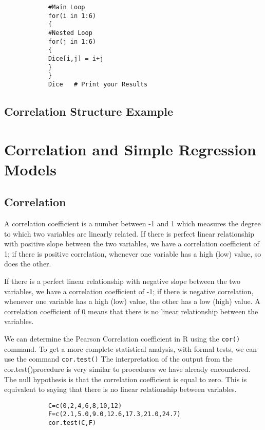 \documentclass[a4paper,12pt]{article}
\begin{document}
\begin{itemize}
\begin{itemize}
\begin{framed}
\begin{verbatim}
			#Main Loop
			for(i in 1:6)
			{
			#Nested Loop
			for(j in 1:6)
			{
			Dice[i,j] = i+j
			}
			}		
			Dice   # Print your Results
			\end{verbatim}
		\end{framed}
		\subsection{Correlation Structure Example}
		
		
		\newpage
		\section{Correlation and Simple Regression Models}
		
		\subsection{Correlation}
		
		A correlation coefficient is a number between -1 and 1 which measures the degree to which two variables are linearly related. If there is perfect linear relationship with positive slope between the two variables, we have a correlation coefficient of 1; if there is positive correlation, whenever one variable has a high (low) value, so does the other.
		
		If there is a perfect linear relationship with negative slope between the two variables, we have a correlation coefficient of -1; if there is negative correlation, whenever one variable has a high (low) value, the other has a low (high) value.
		A correlation coefficient of 0 means that there is no linear relationship between the variables.
		
		We can determine the Pearson Correlation coefficient in R using the \texttt{cor()} command.
		To get a more complete statistical analysis, with formal tests, we can use the command \texttt{cor.test()}
		The interpretation of the output from the cor.test()procedure is very similar to procedures we have already encountered. The null hypothesis is that the correlation coefficient is equal to zero. This is equivalent to saying that there is no linear relationship between variables.
		
		
		\begin{framed}
			\begin{verbatim}
			C=c(0,2,4,6,8,10,12) 
			F=c(2.1,5.0,9.0,12.6,17.3,21.0,24.7)
			cor.test(C,F)
			\end{verbatim}
		\end{framed}
		\begin{verbatim}
		

\end{verbatim}
\end{itemize}
\end{itemize}
\end{document}
